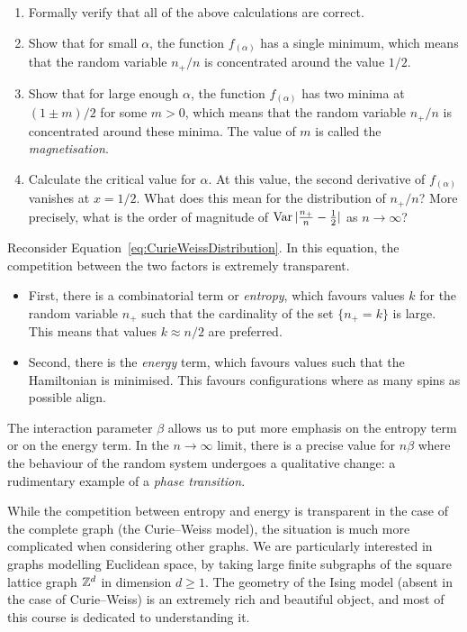 \begin{exercise}
    \begin{enumerate}
        \item Formally verify that all of the above calculations are correct.
        \item Show that for small $\alpha$, the function \( f_{(\alpha)} \) has a single minimum, which means that the random variable \( n_+/n \) is concentrated around the value \( 1/2 \).
        \item Show that for large enough $\alpha$, the function \( f_{(\alpha)} \) has two minima at \( (1 \pm m)/2 \) for some $m>0$, which means that the random variable \( n_+/n \) is concentrated around these minima.
        The value of $m$ is called the \emph{magnetisation}.
        \item Calculate the critical value for $\alpha$. At this value, the second derivative of \( f_{(\alpha)} \) vanishes at \( x=1/2 \). What does this mean for the distribution of \( n_+/n \)?
        More precisely, what is the order of magnitude of $\operatorname{Var}|\frac{n_+}{n}-\frac12|$ as $n\to\infty$?
    \end{enumerate}
\end{exercise}

\begin{remark}
    Reconsider Equation~\eqref{eq:CurieWeissDistribution}.
    In this equation, the competition between the two factors is extremely transparent.
    \begin{itemize}
        \item     First, there is a combinatorial term or \emph{entropy}, which favours values $k$ for the random variable
        $n_+$ such that the cardinality of the set $\{n_+=k\}$ is large.
        This means that values $k\approx n/2$ are preferred.
        \item     Second, there is the \emph{energy} term, which favours values such that the Hamiltonian 
        is minimised. This favours configurations where as many spins as possible align.    
    \end{itemize}
    The interaction parameter $\beta$ allows us to put more emphasis
    on the entropy term or on the energy term.
    In the $n\to\infty$ limit, there is a precise value for $n\beta$
    where the behaviour of the random system undergoes a qualitative change:
    a rudimentary example of a  \emph{phase transition}.
\end{remark}

While the competition between entropy and energy is transparent in the
case of the complete graph (the Curie--Weiss model), the situation is much more
complicated when considering other graphs.
We are particularly interested in graphs modelling Euclidean space,
by taking large finite subgraphs of the square lattice graph $\mathbb Z^d$
in dimension $d\geq 1$.
The geometry of the Ising model (absent in the case of Curie--Weiss)
is an extremely rich and beautiful object,
and most of this course is dedicated to understanding it.
